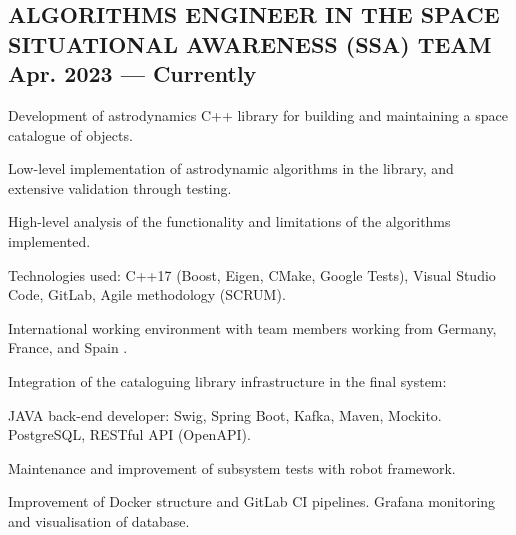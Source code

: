 \documentclass[letter,10pt]{article}
\begin{document}
\subsection{{ALGORITHMS ENGINEER IN THE SPACE SITUATIONAL AWARENESS (SSA) TEAM \hfill Apr. 2023  --- Currently}}
\begin{zitemize}
\item Development of astrodynamics C++ library for building and maintaining a space catalogue of objects.
\begin{zitemize}
    \item Low-level implementation of astrodynamic algorithms in the library, and extensive validation through testing.
    \item High-level analysis of the functionality and limitations of the algorithms implemented.
    \item Technologies used: C++17 (Boost, Eigen, CMake, Google Tests), Visual Studio Code, GitLab, Agile methodology (SCRUM). 
    \item International working environment with team members working from Germany, France, and Spain .
\end{zitemize}
\item Integration of the cataloguing library infrastructure in the final system:
\begin{zitemize}
    \item JAVA back-end developer: Swig, Spring Boot, Kafka, Maven, Mockito. PostgreSQL, RESTful API (OpenAPI).
    \item Maintenance and improvement of subsystem tests with robot framework. 
    \item Improvement of Docker structure and GitLab CI pipelines. Grafana monitoring and visualisation of database.
\end{zitemize}
\end{zitemize}
\end{document}
